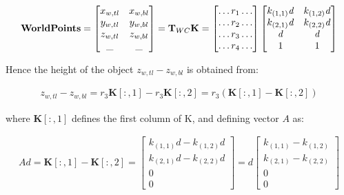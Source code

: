 \documentclass[11pt,twoside]{report}
\begin{document}
\begin{equation}
\mathbf{WorldPoints} = 
\begin{bmatrix}
x_{w,tl} &  x_{w,bl}\\
y_{w,tl} & y_{w,bl}\\
z_{w,tl} & z_{w,bl} \\
\textunderscore & \textunderscore \\
\end{bmatrix} = 
\mathbf{T}_{WC}\mathbf{K} =
\begin{bmatrix}
\dots r_{1} \dots \\
\dots r_{2} \dots \\
\dots r_{3} \dots \\
\dots r_{4} \dots \\
\end{bmatrix}
\begin{bmatrix}
k_{(1,1)}\mathit{d} & k_{(1,2)}\mathit{d}\\
k_{(2,1)}\mathit{d} & k_{(2,2)}\mathit{d}\\
\mathit{d} & \mathit{d}\\
1 & 1
\end{bmatrix} 
\label{check__depth_eq3}
\end{equation}

Hence the height of the object $z_{w,tl}-z_{w,bl}$ is obtained from:

\begin{equation}
\begin{aligned}
z_{w,tl}-z_{w,bl} = r_{3} \mathbf{K}[:,1] - r_{3} \mathbf{K}[:,2] =  r_{3} (\mathbf{K}[:,1]- \mathbf{K}[:,2])
\end{aligned}
\end{equation}

where $\mathbf{K}[:,1]$ defines the first column of K, and defining vector $A$ as:

\begin{equation}
\begin{aligned}
A\mathit{d} = \mathbf{K}[:,1]- \mathbf{K}[:,2] = 
\begin{bmatrix}
k_{(1,1)}\mathit{d} - k_{(1,2)}\mathit{d}\\
k_{(2,1)}\mathit{d} - k_{(2,2)}\mathit{d}\\
0\\
0
\end{bmatrix}
= 
\mathit{d}
\begin{bmatrix}
k_{(1,1)} - k_{(1,2)}\\
k_{(2,1)} - k_{(2,2)}\\
0\\
0
\end{bmatrix}
\end{aligned}
\end{equation}
\end{document}
